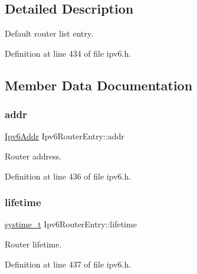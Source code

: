 \subsection{Detailed Description}
Default router list entry. 

Definition at line 434 of file ipv6.\+h.



\subsection{Member Data Documentation}
\mbox{\label{structIpv6RouterEntry_ae229e171486421953e178c27b8527789}} 
\subsubsection{\texorpdfstring{addr}{addr}}
{\footnotesize\ttfamily \hyperlink{ipv6_8h_aed0cbc40c61ed5b4fb681ebc55237e89}{Ipv6\+Addr} Ipv6\+Router\+Entry\+::addr}



Router address. 



Definition at line 436 of file ipv6.\+h.

\mbox{\label{structIpv6RouterEntry_aed560238a63f534a2cecaf1c5eea614c}} 
\subsubsection{\texorpdfstring{lifetime}{lifetime}}
{\footnotesize\ttfamily \hyperlink{compiler__port_8h_ae3e32a98d431a02106616da3071832dd}{systime\+\_\+t} Ipv6\+Router\+Entry\+::lifetime}



Router lifetime. 



Definition at line 437 of file ipv6.\+h.

\mbox{\label{structIpv6RouterEntry_a9b423514103cfe737922334c5f0d9ff2}} 
